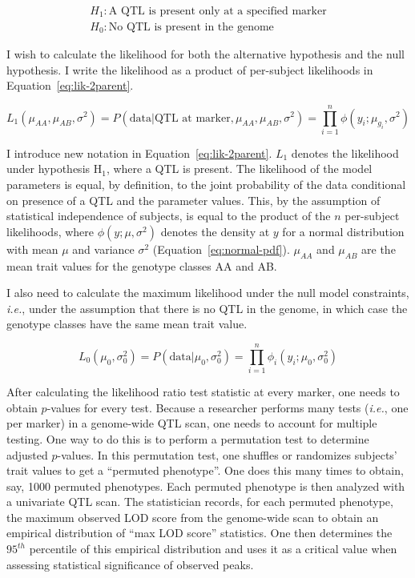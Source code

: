 \documentclass[oneside]{book}\usepackage[]{graphicx}\usepackage[]{color}
\begin{document}
\begin{eqnarray}
H_1: \text{A QTL is present only at a specified marker}\nonumber \\
H_0: \text{No QTL is present in the genome}
\label{eq:qtl-hypotheses}
\end{eqnarray}

I wish to calculate the likelihood for both the alternative hypothesis and the null hypothesis.
I write the likelihood as a product of per-subject likelihoods in Equation~\ref{eq:lik-2parent}.

\begin{equation}
L_1(\mu_{AA}, \mu_{AB}, \sigma^2) = P(\text{data}| \text{QTL at marker}, \mu_{AA}, \mu_{AB}, \sigma^2) = \prod_{i=1}^n\phi(y_i; \mu_{g_i}, \sigma^2)
\label{eq:lik-2parent}
\end{equation}

I introduce new notation in Equation~\ref{eq:lik-2parent}. $L_1$ denotes the likelihood under 
hypothesis H$_1$, where a QTL is present. The likelihood of the model parameters is equal, by definition, to the joint 
probability of the data conditional on presence of a QTL and the parameter values. This, by the 
assumption of statistical independence of subjects, is equal to the product of the $n$ 
per-subject likelihoods, where $\phi(y; \mu, \sigma^2)$ denotes the density at $y$ for a normal 
distribution with mean $\mu$ and variance $\sigma^2$ (Equation~\ref{eq:normal-pdf}). $\mu_{AA}$ and $\mu_{AB}$ are the mean trait values for the genotype classes AA and AB. 


I also need to calculate the maximum likelihood under the null model constraints, \emph{i.e.}, under the assumption that there is no QTL in the genome, in which case the genotype classes have the same mean trait value. 

\begin{equation}
L_0(\mu_0, \sigma^2_0) = P(\text{data}| \mu_0, \sigma^2_0) = \prod_{i=1}^n \phi_i(y_i; \mu_0, \sigma^2_0)
\end{equation}




After calculating the likelihood ratio test statistic at every marker,
one needs to obtain $p$-values for every test. Because a researcher performs many
tests (\emph{i.e.}, one per marker) in a genome-wide QTL scan, one needs to account for multiple testing. One way to do this is to perform
a permutation test to determine adjusted $p$-values. In this permutation test, one
shuffles or randomizes subjects' trait values to get a ``permuted phenotype''. One
does this many times to obtain, say, 1000 permuted phenotypes. Each permuted phenotype
is then analyzed with a univariate QTL scan. The statistician records, for
each permuted phenotype, the maximum observed LOD score from the genome-wide scan to
obtain an empirical distribution of ``max LOD score'' statistics. One then
determines the $95^{th}$ percentile of this empirical distribution and uses it as 
a critical value when assessing statistical significance of observed peaks.
\end{document}
